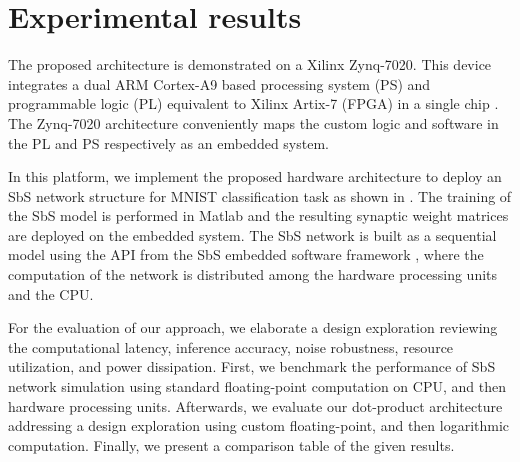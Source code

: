\section{Experimental results}
\label{sec:experimental_results}
The proposed architecture is demonstrated on a Xilinx Zynq-7020. This device integrates a dual ARM Cortex-A9 based processing system (PS) and programmable logic (PL) equivalent to Xilinx Artix-7 (FPGA) in a single chip \cite{xilinx2015zynq}. The Zynq-7020 architecture conveniently maps the custom logic and software in the PL and PS respectively as an embedded system.

In this platform, we implement the proposed hardware architecture to deploy an SbS network structure for MNIST classification task as shown in . The training of the SbS model is performed in Matlab and the resulting synaptic weight matrices are deployed on the embedded system. The SbS network is built as a sequential model using the API from the SbS embedded software framework \cite{nevarez2020accelerator}, where the computation of the network is distributed among the hardware processing units and the CPU.

For the evaluation of our approach, we elaborate a design exploration reviewing the computational latency, inference accuracy, noise robustness, resource utilization, and power dissipation. First, we benchmark the performance of SbS network simulation using standard floating-point computation on CPU, and then hardware processing units. Afterwards, we evaluate our dot-product architecture addressing a design exploration using custom floating-point, and then logarithmic computation. Finally, we present a comparison table of the given results.

